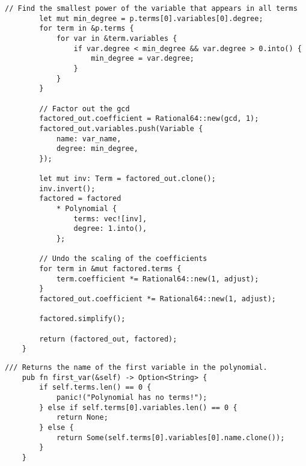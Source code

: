 \begin{lstlisting}[caption={The implementation of the \texttt{factor()} method for the \texttt{Polynomial} struct}, label={lst:polynomial-factor}]
        // Find the smallest power of the variable that appears in all terms
        let mut min_degree = p.terms[0].variables[0].degree;
        for term in &p.terms {
            for var in &term.variables {
                if var.degree < min_degree && var.degree > 0.into() {
                    min_degree = var.degree;
                }
            }
        }

        // Factor out the gcd
        factored_out.coefficient = Rational64::new(gcd, 1);
        factored_out.variables.push(Variable {
            name: var_name,
            degree: min_degree,
        });

        let mut inv: Term = factored_out.clone();
        inv.invert();
        factored = factored
            * Polynomial {
                terms: vec![inv],
                degree: 1.into(),
            };

        // Undo the scaling of the coefficients
        for term in &mut factored.terms {
            term.coefficient *= Rational64::new(1, adjust);
        }
        factored_out.coefficient *= Rational64::new(1, adjust);

        factored.simplify();

        return (factored_out, factored);
    }
\end{lstlisting}

\begin{lstlisting}[caption={The implementation of the \texttt{first\_var()} method for the \texttt{Polynomial} struct}, label={lst:polynomial-first-var}]
    /// Returns the name of the first variable in the polynomial.
    pub fn first_var(&self) -> Option<String> {
        if self.terms.len() == 0 {
            panic!("Polynomial has no terms!");
        } else if self.terms[0].variables.len() == 0 {
            return None;
        } else {
            return Some(self.terms[0].variables[0].name.clone());
        }
    }
\end{lstlisting}


